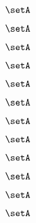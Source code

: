 {\begin{forslides}
        \begin{equation}
            \label{eq:slides-translation-97}
            \setA
        \end{equation}

        \begin{equation}
            \label{eq:slides-translation-98}
            \setA
        \end{equation}

        \begin{equation}
            \label{eq:slides-translation-99}
            \setA
        \end{equation}

        \begin{equation}
            \label{eq:slides-translation-100}
            \setA
        \end{equation}

        \begin{equation}
            \label{eq:slides-translation-111}
            \setA
        \end{equation}

        \begin{equation}
            \label{eq:slides-translation-112}
            \setA
        \end{equation}

        \begin{equation}
            \label{eq:slides-translation-113}
            \setA
        \end{equation}

        \begin{equation}
            \label{eq:slides-translation-114}
            \setA
        \end{equation}

        \begin{equation}
            \label{eq:slides-translation-115}
            \setA
        \end{equation}

        \begin{equation}
            \label{eq:slides-translation-116}
            \setA
        \end{equation}

        \begin{equation}
            \label{eq:slides-translation-117}
            \setA
        \end{equation}

        \begin{equation}
            \label{eq:slides-translation-118}
            \setA
        \end{equation}


\end{forslides}}
